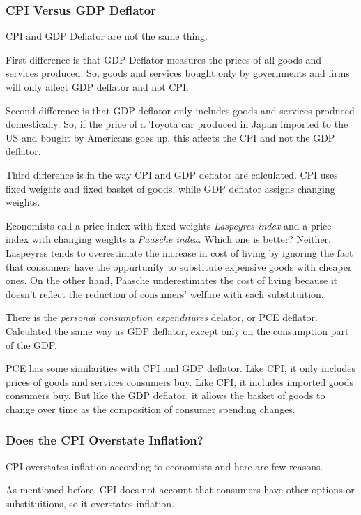 \documentclass[12pt]{article}
\begin{document}
\subsubsection{CPI Versus GDP Deflator}

CPI and GDP Deflator are not the same thing.

First difference is that GDP Deflator measures the prices of all goods and services produced. So, goods and services bought only by governments and firms will only affect GDP deflator and not CPI.

Second difference is that GDP deflator only includes goods and services produced domestically. So, if the price of a Toyota car produced in Japan imported to the US and bought by Americans goes up, this affects the CPI and not the GDP deflator.

Third difference is in the way CPI and GDP deflator are calculated. CPI uses fixed weights and fixed basket of goods, while GDP deflator assigns changing weights.

Economists call a price index with fixed weights \textit{Laspeyres index} and a price index with changing weights a \textit{Paasche index}. Which one is better? Neither. Laspeyres tends to overestimate the increase in cost of living by ignoring the fact that consumers have the oppurtunity to substitute expensive goods with cheaper ones. On the other hand, Paasche underestimates the cost of living because it doesn't reflect the reduction of consumers' welfare with each substituition.

There is the \textit{personal consumption expenditures} delator, or PCE deflator. Calculated the same way as GDP deflator, except only on the consumption part of the GDP.

PCE has some similarities with CPI and GDP deflator. Like CPI, it only includes prices of goods and services consumers buy. Like CPI, it includes imported goods consumers buy. But like the GDP deflator, it allows the basket of goods to change over time as the composition of consumer spending changes.

\subsubsection{Does the CPI Overstate Inflation?}

CPI overstates inflation according to economists and here are few reasons.

As mentioned before, CPI does not account that consumers have other options or substituitions, so it overstates inflation.
\end{document}
